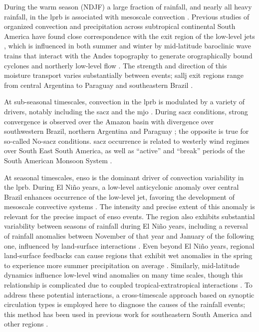 \documentclass[twocol]{ametsoc}
\begin{document}
During the warm season (NDJF) a large fraction of rainfall, and nearly all heavy rainfall, in the \gls{lprb} is associated with mesoscale convection \citep{Velasco1987}.
Previous studies of organized convection and precipitation across subtropical continental South America have found close correspondence with the exit region of the low-level jets \citep{Saulo2007,Salio2007,Marengo2004,Velasco1987}, which is influenced in both summer and winter by mid-latitude baroclinic wave trains that interact with the Andes topography to generate orographically bound cyclones and northerly low-level flow \citep{Campetella2002,Seluchi2006,Boers2013,Boers2014}.
The strength and direction of this moisture transport varies substantially between events; \gls{sallj} exit regions range from central Argentina \citep[``Chaco Jet Events'';][]{Salio2002} to Paraguay and southeastern Brazil \citep[``No-Chaco Jet Events'';][]{Vera2006}.

At sub-seasonal timescales, convection in the \gls{lprb} is modulated by a variety of drivers, notably including the \gls{sacz} and the \gls{mjo}  .
During \gls{sacz} conditions, strong convergence is observed over the Amazon basin with divergence over southwestern Brazil, northern Argentina and Paraguay \citep{Herdies2002,Carvalho2010}; the opposite is true for so-called No-\gls{sacz} conditions.
\Gls{sacz} occurrence is related to westerly wind regimes over South East South America, as well as ``active'' and ``break'' periods of the South American Monsoon System \citep{Marengo2004}.

At seasonal timescales, \gls{enso} is the dominant driver of convection variability in the \gls{lprb}.
During El Ni\~no years, a low-level anticyclonic anomaly over central Brazil enhances occurrence of the low-level jet, favoring the development of mesoscale convective systems \citep{Velasco1987}.
The intensity and precise extent of this anomaly is relevant for the precise impact of \gls{enso} events.
The region also exhibits substantial variability between seasons of rainfall during El Ni\~no years, including a reversal of rainfall anomalies between November of that year and January of the following one, influenced by land-surface interactions \citep{Grimm2009,Grimm2003}.
Even beyond El Ni\~no years, regional land-surface feedbacks can cause regions that exhibit wet anomalies in the spring to experience more summer precipitation on average \citep{Grimm2007}.
Similarly, mid-latitude dynamics influence low-level wind anomalies on many time scales, though this relationship is complicated due to coupled tropical-extratropical interactions \citep{Carvalho2004,Jones2002}.
To address these potential interactions, a cross-timescale approach based on synoptic circulation types is employed here to diagnose the causes of the rainfall events; this method has been used in previous work for southeastern South America \citep{Munoz2015,Munoz2016} and other regions \citep{Moron2015}.
\end{document}
